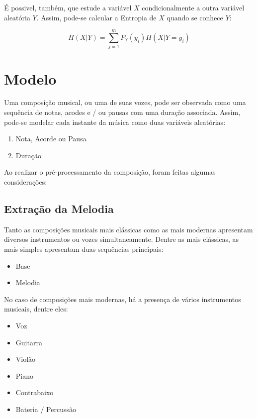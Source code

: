 É possivel, também, que estude a variável $X$ condicionalmente a outra variável aleatória $Y$. Assim, pode-se calcular a Entropia de $X$ quando se conhece $Y$:

\begin{equation}
    H(X|Y) =  \sum_{j=1}^{m} P_Y(y_i) H(X|Y = y_i)
\end{equation}


\section{Modelo}

Uma composição musical, ou uma de suas vozes, pode ser observada como uma sequência de notas, acodes e / ou pausas com uma duração associada. Assim, pode-se modelar cada instante da música como duas variáveis aleatórias:

\begin{enumerate}
    \item Nota, Acorde ou Pausa
    \item Duração
\end{enumerate}

Ao realizar o pré-processamento da composição, foram feitas algumas considerações:

\subsection{Extração da Melodia}

Tanto as composições musicais mais clássicas como as mais modernas apresentam diversos instrumentos ou vozes simultaneamente. Dentre as mais clássicas, as mais simples apresentam duas sequências principais:

\begin{itemize}
    \item Base
    \item Melodia
\end{itemize}

No caso de composições mais modernas, há a presença de vários instrumentos musicais, dentre eles:

\begin{itemize}
    \item Voz
    \item Guitarra
    \item Violão
    \item Piano
    \item Contrabaixo
    \item Bateria / Percussão
\end{itemize}

